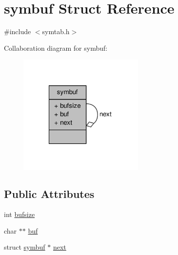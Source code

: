 \hypertarget{structsymbuf}{\section{symbuf \-Struct \-Reference}
\label{structsymbuf}
}


{\ttfamily \#include $<$symtab.\-h$>$}



\-Collaboration diagram for symbuf\-:
\nopagebreak
\begin{figure}[H]
\begin{center}
\leavevmode
\includegraphics[width=176pt]{structsymbuf__coll__graph}
\end{center}
\end{figure}
\subsection*{\-Public \-Attributes}
\begin{DoxyCompactItemize}
\item 
int \hyperlink{structsymbuf_a425fb9fd6079675c20aa24a16cd7bf5e}{bufsize}
\item 
char $\ast$$\ast$ \hyperlink{structsymbuf_a7e068cdb7159f3e035f160d5ec34d455}{buf}
\item 
struct \hyperlink{structsymbuf}{symbuf} $\ast$ \hyperlink{structsymbuf_a85f0768f300a2b2174af951f4f5c5115}{next}
\end{DoxyCompactItemize}


